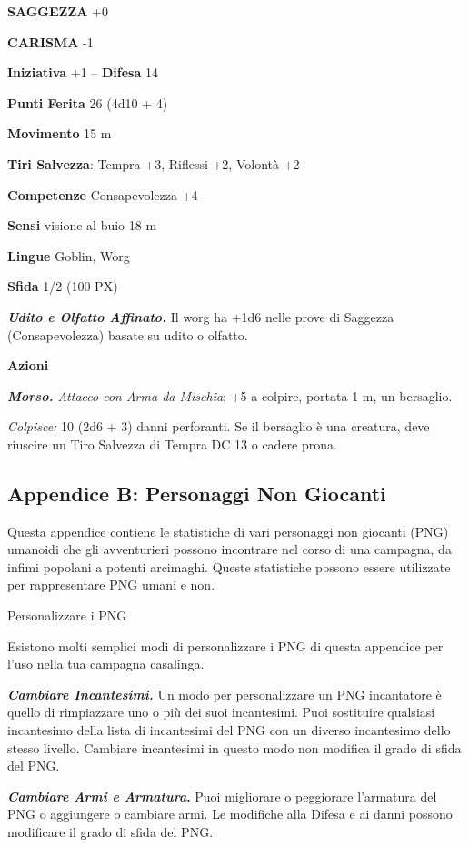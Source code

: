 \begin{multicols}{2}
	\textbf{SAGGEZZA} +0

	\textbf{CARISMA} -1

	\textbf{Iniziativa} +1 -- \textbf{Difesa} 14

	\textbf{Punti Ferita} 26 (4d10 + 4)

	\textbf{Movimento} 15 m

	\textbf{Tiri Salvezza}: Tempra +3, Riflessi +2, Volontà +2

	\textbf{Competenze} Consapevolezza +4

	\textbf{Sensi} visione al buio 18 m

	\textbf{Lingue} Goblin, Worg

	\textbf{Sfida} 1/2 (100 PX)

	\textit{\textbf{Udito e Olfatto Affinato.}} Il worg ha +1d6 nelle prove di Saggezza (Consapevolezza) basate su udito o olfatto.

	\textbf{Azioni}

	\textit{\textbf{Morso.} Attacco con Arma da Mischia}: +5 a colpire, portata 1 m, un bersaglio.

	\textit{Colpisce:} 10 (2d6 + 3) danni perforanti. Se il bersaglio è una creatura, deve riuscire un Tiro Salvezza di Tempra DC 13 o cadere prona.

	\subsection{Appendice B: Personaggi Non Giocanti}

	Questa appendice contiene le statistiche di vari personaggi non giocanti (PNG) umanoidi che gli avventurieri possono incontrare nel corso di una campagna, da infimi popolani a potenti arcimaghi. Queste statistiche possono essere utilizzate per rappresentare PNG umani e non.

	Personalizzare i PNG

	Esistono molti semplici modi di personalizzare i PNG di questa appendice per l'uso nella tua campagna casalinga.

	\textit{\textbf{Cambiare Incantesimi.}} Un modo per personalizzare un PNG incantatore è quello di rimpiazzare uno o più dei suoi incantesimi. Puoi sostituire qualsiasi incantesimo della lista di
	incantesimi del PNG con un diverso incantesimo dello stesso livello. Cambiare incantesimi in questo modo non modifica il grado di sfida del PNG.

	\textbf{\textit{Cambiare Armi e Armatura}.} Puoi migliorare o peggiorare l'armatura del PNG o aggiungere o cambiare armi. Le modifiche alla Difesa e ai danni possono modificare il grado di sfida del PNG.


\end{multicols}
